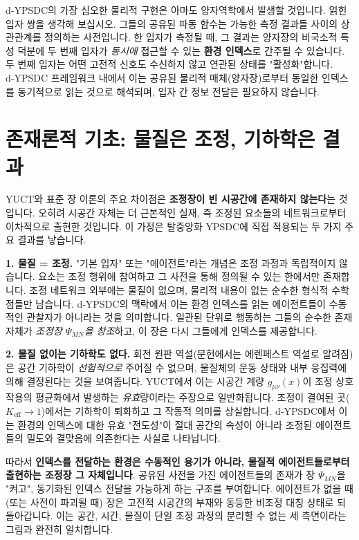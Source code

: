 \documentclass[11pt,a4paper]{article}
\begin{document}
	d‑YPSDC의 가장 심오한 물리적 구현은 아마도 양자역학에서 발생할 것입니다. 얽힌 입자 쌍을 생각해 보십시오. 그들의 공유된 파동 함수는 가능한 측정 결과들 사이의 상관관계를 정의하는 사전입니다. 한 입자가 측정될 때, 그 결과는 양자장의 비국소적 특성 덕분에 두 번째 입자가 \emph{동시에} 접근할 수 있는 \textbf{환경 인덱스}로 간주될 수 있습니다. 두 번째 입자는 어떤 고전적 신호도 수신하지 않고 연관된 상태를 "활성화"합니다. d‑YPSDC 프레임워크 내에서 이는 공유된 물리적 매체(양자장)로부터 동일한 인덱스를 동기적으로 읽는 것으로 해석되며, 입자 간 정보 전달은 필요하지 않습니다.
	
	\section{존재론적 기초: 물질은 조정, 기하학은 결과}
	
	YUCT와 표준 장 이론의 주요 차이점은 \textbf{조정장이 빈 시공간에 존재하지 않는다}는 것입니다. 오히려 시공간 자체는 더 근본적인 실재, 즉 조정된 요소들의 네트워크로부터 이차적으로 출현한 것입니다. 이 가정은 탈중앙화 YPSDC에 직접 적용되는 두 가지 주요 결과를 낳습니다.
	
	\textbf{1. 물질 = 조정.} "기본 입자" 또는 "에이전트"라는 개념은 조정 과정과 독립적이지 않습니다. 요소는 조정 행위에 참여하고 그 사전을 통해 정의될 수 있는 한에서만 존재합니다. 조정 네트워크 외부에는 물질이 없으며, 물리적 내용이 없는 순수한 형식적 수학 점들만 남습니다. d‑YPSDC의 맥락에서 이는 환경 인덱스를 읽는 에이전트들이 수동적인 관찰자가 아니라는 것을 의미합니다. 일관된 단위로 행동하는 그들의 순수한 존재 자체가 \emph{조정장 \(\Psi_{MN}\)을 창조}하고, 이 장은 다시 그들에게 인덱스를 제공합니다.
	
	\textbf{2. 물질 없이는 기하학도 없다.} 회전 원판 역설(문헌에서는 에렌페스트 역설로 알려짐)은 공간 기하학이 \emph{선험적으로} 주어질 수 없으며, 물질체의 운동 상태와 내부 응집력에 의해 결정된다는 것을 보여줍니다. YUCT에서 이는 시공간 계량 \(g_{\mu\nu}(x)\)이 조정 상호작용의 평균화에서 발생하는 \emph{유효}량이라는 주장으로 일반화됩니다. 조정이 결여된 곳(\(K_{\mathrm{eff}} \to 1\))에서는 기하학이 퇴화하고 그 작동적 의미를 상실합니다. d‑YPSDC에서 이는 환경의 인덱스에 대한 유효 "전도성"이 절대 공간의 속성이 아니라 조정된 에이전트들의 밀도와 결맞음에 의존한다는 사실로 나타납니다.
	
	따라서 \textbf{인덱스를 전달하는 환경은 수동적인 용기가 아니라, 물질적 에이전트들로부터 출현하는 조정장 그 자체입니다}. 공유된 사전을 가진 에이전트들의 존재가 장 \(\Psi_{MN}\)을 "켜고", 동기화된 인덱스 전달을 가능하게 하는 구조를 부여합니다. 에이전트가 없을 때(또는 사전이 파괴될 때) 장은 고전적 시공간의 부재와 동등한 비조정 대칭 상태로 되돌아갑니다. 이는 공간, 시간, 물질이 단일 조정 과정의 분리할 수 없는 세 측면이라는 그림과 완전히 일치합니다.
	
\end{document}
